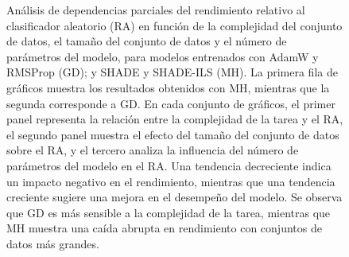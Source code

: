 \begin{figure}
    \centering
    \hfill
    \caption[Análisis de dependencias parciales del rendimiento relativo al clasificador aleatorio en función de la complejidad del conjunto de datos, el tamaño del conjunto de datos y el número de parámetros del modelo]{Análisis de dependencias parciales del rendimiento relativo al clasificador aleatorio (RA) en función de la complejidad del conjunto de datos, el tamaño del conjunto de datos y el número de parámetros del modelo, para modelos entrenados con AdamW y RMSProp (GD); y SHADE y SHADE-ILS (MH). La primera fila de gráficos muestra los resultados obtenidos con MH, mientras que la segunda corresponde a GD. En cada conjunto de gráficos, el primer panel representa la relación entre la complejidad de la tarea y el RA, el segundo panel muestra el efecto del tamaño del conjunto de datos sobre el RA, y el tercero analiza la influencia del número de parámetros del modelo en el RA. Una tendencia decreciente indica un impacto negativo en el rendimiento, mientras que una tendencia creciente sugiere una mejora en el desempeño del modelo. Se observa que GD es más sensible a la complejidad de la tarea, mientras que MH muestra una caída abrupta en rendimiento con conjuntos de datos más grandes.}
    \label{fig:pda}
\end{figure}




